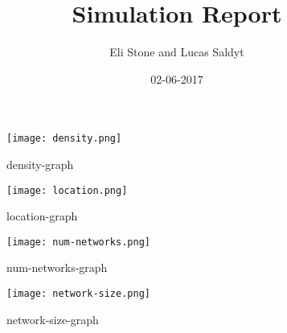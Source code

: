 \documentclass{article}
\title{Simulation Report}
\date{02-06-2017}
\author{Eli Stone and Lucas Saldyt}
\begin{document}
\maketitle
{}
\newpage
{}


\begin {figure}
\texttt{[image: density.png]}
\caption{density-graph}
\label{0}
\end{figure}


\begin {figure}
\texttt{[image: location.png]}
\caption{location-graph}
\label{1}
\end{figure}


\begin {figure}
\texttt{[image: num-networks.png]}
\caption{num-networks-graph}
\label{2}
\end{figure}


\begin {figure}
\texttt{[image: network-size.png]}
\caption{network-size-graph}
\label{3}
\end{figure}
\end{document}
